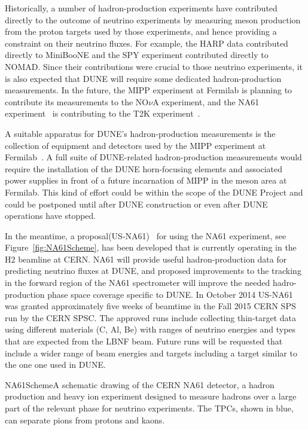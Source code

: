 Historically, a number of hadron-production experiments have
contributed directly to the outcome of neutrino experiments
by measuring meson production from the proton targets used
by those experiments, and hence providing a constraint on their neutrino fluxes. 
For example, the HARP data\cite{ref:HARP} contributed directly to
MiniBooNE and the SPY\cite{ref:SPY} experiment contributed directly to
NOMAD. Since their contributions were crucial to those neutrino experiments, 
it is also expected that DUNE will require some dedicated hadron-production measurements.
In the future, the MIPP experiment at Fermilab is planning to contribute its
measurements to the NO$\nu$A experiment, and the NA61
experiment~\cite{Abgrall:2011ae, Abgrall:2011ts} is contributing to the T2K
experiment~\cite{Abe:2012av}.

A suitable apparatus for DUNE's hadron-production measurements
is the collection of equipment and detectors used by the MIPP experiment at Fermilab~\cite{Isenhower:2006zp}.   
A full suite of DUNE-related
hadron-production measurements would require the installation of the DUNE horn-focusing
elements and associated power supplies in front of a future
incarnation of MIPP in the meson area at Fermilab.
This kind of effort could be within the scope of the DUNE Project and could be postponed
until after DUNE construction or even after DUNE operations have
stopped. 

In the meantime, a proposal(US-NA61)~\cite{NA61:2014fnalbeams} for using the NA61 experiment, see Figure~\ref{fig:NA61Scheme}, has been developed
that is currently operating in the H2 beamline at CERN. NA61 will provide useful 
hadron-production data for predicting neutrino fluxes at DUNE, and proposed improvements 
to the tracking in the forward region of the NA61 spectrometer will improve the needed 
hadro-production phase space coverage specific to DUNE. In October 2014 US-NA61 was granted approximately
five weeks of beamtime in the Fall 2015 CERN SPS run by the CERN SPSC. The approved
runs include collecting thin-target data using different materials (C, Al, Be) with 
ranges of neutrino energies and types that are expected from the LBNF beam. 
Future runs will be requested that include a wider range of beam energies and targets including a 
target similar to the one one used in DUNE.

\begin{cdrfigure}{NA61Scheme}{A schematic drawing of the CERN NA61 detector, a hadron production and heavy ion experiment 
designed to measure hadrons over a large part of the relevant phase for 
neutrino experiments. The TPCs, shown in blue, can separate pions from protons and kaons.}
\end{cdrfigure}
